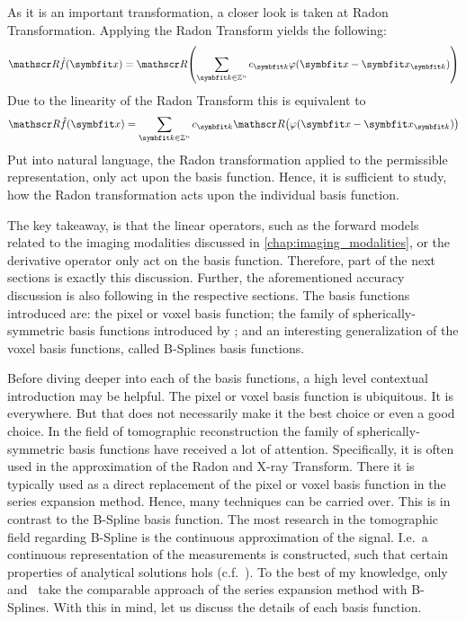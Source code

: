 As it is an important transformation, a closer look is taken at Radon Transformation. Applying the
Radon Transform yields the following:
\begin{equation}
	\radon\near{f}(\mvec{x}) = \radon\left( \sum_{\mvec{k} \in \mathbb{Z}^n} c_{\mvec{k}} \varphi(\mvec{x} - \mvec{x}_{\mvec{k}}) \right)
\end{equation}
Due to the linearity of the Radon Transform this is equivalent to
\begin{equation}
	\radon\hat{f}(\mvec{x}) = \sum_{\mvec{k} \in \mathbb{Z}^n} c_{\mvec{k}}\radon\left( \varphi(\mvec{x} - \mvec{x}_{\mvec{k}}) \right)
\end{equation}
Put into natural language, the Radon transformation applied to the permissible representation, only
act upon the basis function. Hence, it is sufficient to study, how the Radon transformation acts
upon the individual basis function.

The key takeaway, is that the linear operators, such as the forward models related to the imaging
modalities discussed in \autoref{chap:imaging_modalities}, or the derivative operator only act on
the basis function. Therefore, part of the next sections is exactly this discussion. Further, the
aforementioned accuracy discussion is also following in the respective sections. The basis functions
introduced are: the pixel or voxel basis function; the family of spherically-symmetric basis
functions introduced by \citeauthor*{lewitt_multidimensional_1990}; and an interesting
generalization of the voxel basis functions, called B-Splines basis functions.

Before diving deeper into each of the basis functions, a high level contextual introduction may be
helpful. The pixel or voxel basis function is ubiquitous. It is everywhere. But that does not
necessarily make it the best choice or even a good choice. In the field of tomographic
reconstruction the family of spherically-symmetric basis functions have received a lot of attention.
Specifically, it is often used in the approximation of the Radon and X-ray Transform. There it is
typically used as a direct replacement of the pixel or voxel basis function in the series expansion
method. Hence, many techniques can be carried over. This is in contrast to the B-Spline basis
function. The most research in the tomographic field regarding B-Spline is the continuous
approximation of the signal. I.e.\ a continuous representation of the measurements is constructed,
such that certain properties of analytical solutions hols (c.f.~\cite{horbelt_discretization_2002}).
To the best of my knowledge, only~\cite{nilchian_fast_2013}
and~\cite{momey_new_2011,momey_b-spline_2012,momey_spline_2015} take the comparable approach of the
series expansion method with B-Splines. With this in mind, let us discuss the details of each basis
function.


